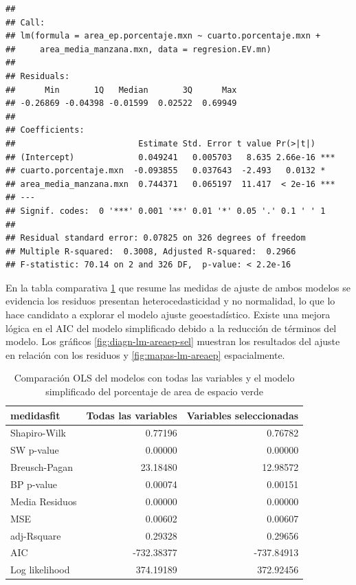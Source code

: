 \documentclass[12pt,]{book}
\begin{document}
\begin{verbatim}
## 
## Call:
## lm(formula = area_ep.porcentaje.mxn ~ cuarto.porcentaje.mxn + 
##     area_media_manzana.mxn, data = regresion.EV.mn)
## 
## Residuals:
##      Min       1Q   Median       3Q      Max 
## -0.26869 -0.04398 -0.01599  0.02522  0.69949 
## 
## Coefficients:
##                         Estimate Std. Error t value Pr(>|t|)    
## (Intercept)             0.049241   0.005703   8.635 2.66e-16 ***
## cuarto.porcentaje.mxn  -0.093855   0.037643  -2.493   0.0132 *  
## area_media_manzana.mxn  0.744371   0.065197  11.417  < 2e-16 ***
## ---
## Signif. codes:  0 '***' 0.001 '**' 0.01 '*' 0.05 '.' 0.1 ' ' 1
## 
## Residual standard error: 0.07825 on 326 degrees of freedom
## Multiple R-squared:  0.3008, Adjusted R-squared:  0.2966 
## F-statistic: 70.14 on 2 and 326 DF,  p-value: < 2.2e-16
\end{verbatim}

En la tabla comparativa \ref{tab:comp-lm-areaep} que resume las medidas
de ajuste de ambos modelos se evidencia los residuos presentan
heterocedasticidad y no normalidad, lo que lo hace candidato a explorar
el modelo ajuste geoestadístico. Existe una mejora lógica en el AIC del
modelo simplificado debido a la reducción de términos del modelo. Los
gráficos \ref{fig:diagn-lm-areaep-sel} muestran los resultados del
ajuste en relación con los residuos y \ref{fig:mapas-lm-areaep}
espacialmente.

\begin{table}

\caption{\label{tab:comp-lm-areaep}Comparación OLS del modelos con todas las variables y el modelo simplificado del porcentaje de area de espacio verde}
\centering
\begin{tabular}[t]{l|r|r}
\hline
medidasfit & Todas las variables & Variables seleccionadas\\
\hline
Shapiro-Wilk & 0.77196 & 0.76782\\
\hline
SW p-value & 0.00000 & 0.00000\\
\hline
Breusch-Pagan & 23.18480 & 12.98572\\
\hline
BP p-value & 0.00074 & 0.00151\\
\hline
Media Residuos & 0.00000 & 0.00000\\
\hline
MSE & 0.00602 & 0.00607\\
\hline
adj-Rsquare & 0.29328 & 0.29656\\
\hline
AIC & -732.38377 & -737.84913\\
\hline
Log likelihood & 374.19189 & 372.92456\\
\hline
\end{tabular}
\end{table}
\end{document}
